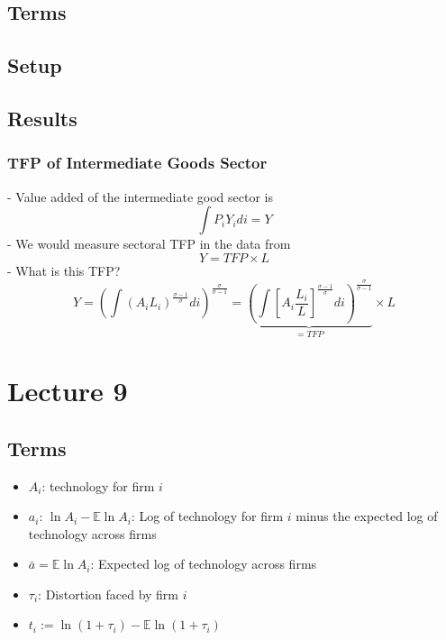 \documentclass[10pt]{article}
\begin{document}
\subsection{Terms}

\subsection{Setup}

\subsection{Results}

\subsubsection{TFP of Intermediate Goods Sector}

- Value added of the intermediate good sector is
$$
\int P_i Y_i d i=Y
$$
- We would measure sectoral TFP in the data from
$$
Y=T F P \times L
$$
- What is this TFP?
$$
Y=\left(\int\left(A_i L_i\right)^{\frac{\sigma-1}{\sigma}} d i\right)^{\frac{\sigma}{\sigma-1}}=\underbrace{\left(\int\left[A_i \frac{L_i}{L}\right]^{\frac{\sigma-1}{\sigma}} d i\right)^{\frac{\sigma}{\sigma-1}}}_{=T F P} \times L
$$


\section{Lecture 9}

\subsection{Terms}

\begin{itemize}
    \item $A_i$: technology for firm $i$
    \item $a_i$: $\ln A_i-\mathbb{E} \ln A_i$: Log of technology for firm $i$ minus the expected log of technology across firms
    \item $\bar{a}=\mathbb{E} \ln A_i$: Expected log of technology across firms
    \item $\tau_i$: Distortion faced by firm $i$
    \item $t_i:=\ln \left(1+\tau_i\right)-\mathbb{E} \ln \left(1+\tau_i\right)$
\end{itemize}
\end{document}
